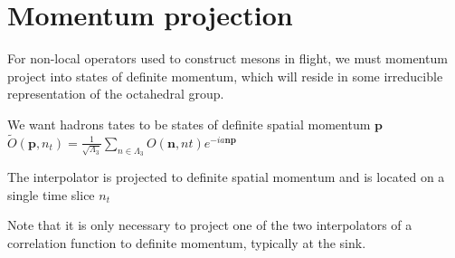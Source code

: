 \section{Momentum projection}
For non-local operators used to construct mesons in flight, we must momentum project into states of definite momentum, which will reside in some irreducible representation of the octahedral group. 

We want hadrons tates to be states of definite spatial momentum $\textbf{p}$ 
$\tilde{O}(\textbf{p},n_t) = \frac{1}{\sqrt{\Lambda_3}} \sum_{n\in\Lambda_3} O(\textbf{n},nt)e^{-ia\textbf{np}}$ 

The interpolator is projected to definite spatial momentum and is located on a single time slice $n_t$

Note that it is only necessary to project one of the two interpolators of a correlation function to definite momentum, typically at the sink. 



